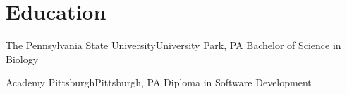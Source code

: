 
\section{Education}
\resumeSubHeadingListStart
  \resumeSubheading
    {The Pennsylvania State University}{University Park, PA}
    {Bachelor of Science in Biology}{}

  \resumeSubheading
    {Academy Pittsburgh}{Pittsburgh, PA}
    {Diploma in Software Development}{}
\resumeSubHeadingListEnd